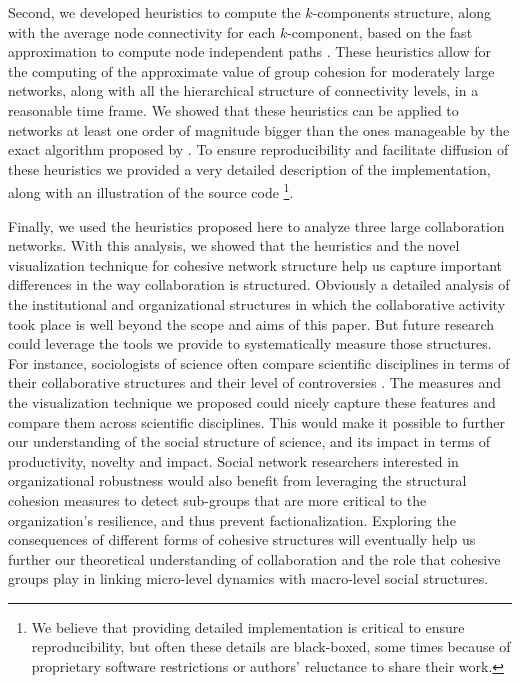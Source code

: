 Second, we developed heuristics to compute the $k$-components structure, along with the average node connectivity for each $k$-component, based on the fast approximation to compute node independent paths \citep{white:2001b}. These heuristics allow for the computing of the approximate value of group cohesion for moderately large networks, along with all the hierarchical structure of connectivity levels, in a reasonable time frame. We showed that these heuristics can be applied to networks at least one order of magnitude bigger than the ones manageable by the exact algorithm proposed by \citet{moody:2003}. To ensure reproducibility and facilitate diffusion of these heuristics we provided a very detailed description of the implementation, along with an illustration of the source code \footnote{We believe that providing detailed implementation is critical to ensure reproducibility, but often these details are black-boxed, some times because of proprietary software restrictions or authors' reluctance to share their work.}. 

Finally, we used the heuristics proposed here to analyze three large collaboration networks. With this analysis, we showed that the heuristics and the novel visualization technique for cohesive network structure help us capture important differences in the way collaboration is structured. Obviously a detailed analysis of the institutional and organizational structures in which the collaborative activity took place is well beyond the scope and aims of this paper. But future research could leverage the tools we provide to systematically measure those structures. For instance, sociologists of science often compare scientific disciplines in terms of their collaborative structures \citep{moody:2004} and their level of controversies \citep{bearman:2010}. The measures and the visualization technique we proposed could nicely capture these features and compare them across scientific disciplines. This would make it possible to further our understanding of the social structure of science, and its impact in terms of productivity, novelty and impact. Social network researchers interested in organizational robustness would also benefit from leveraging the structural cohesion measures to detect sub-groups that are more critical to the organization's resilience, and thus prevent factionalization. Exploring the consequences of different forms of cohesive structures will eventually help us further our theoretical understanding of collaboration and the role that cohesive groups play in linking micro-level dynamics with macro-level social structures.
